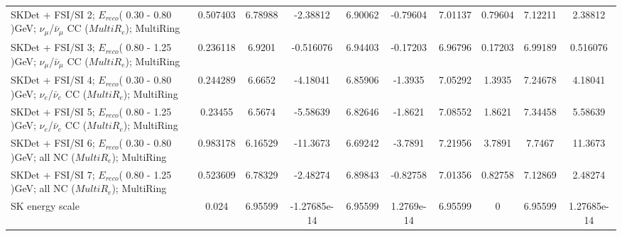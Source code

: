\begin{tabular}{| l | S | S  S | S  S | S  S | S  S | }
SKDet + FSI/SI  2; $E_{reco}$( 0.30 - 0.80 )GeV; $\nu_{\mu}$/$\bar{\nu}_{\mu}$ CC ($MultiR_{e}$); MultiRing &        0.507403 &         6.78988 &        -2.38812 &         6.90062 &        -0.79604 &         7.01137 &         0.79604 &         7.12211 &         2.38812 \\ 
SKDet + FSI/SI  3; $E_{reco}$( 0.80 - 1.25 )GeV; $\nu_{\mu}$/$\bar{\nu}_{\mu}$ CC ($MultiR_{e}$); MultiRing &        0.236118 &          6.9201 &       -0.516076 &         6.94403 &        -0.17203 &         6.96796 &         0.17203 &         6.99189 &        0.516076 \\ 
SKDet + FSI/SI  4; $E_{reco}$( 0.30 - 0.80 )GeV; $\nu_{e}$/$\bar{\nu}_{e}$ CC ($MultiR_{e}$); MultiRing &        0.244289 &          6.6652 &        -4.18041 &         6.85906 &         -1.3935 &         7.05292 &          1.3935 &         7.24678 &         4.18041 \\ 
SKDet + FSI/SI  5; $E_{reco}$( 0.80 - 1.25 )GeV; $\nu_{e}$/$\bar{\nu}_{e}$ CC ($MultiR_{e}$); MultiRing &         0.23455 &          6.5674 &        -5.58639 &         6.82646 &         -1.8621 &         7.08552 &          1.8621 &         7.34458 &         5.58639 \\ 
SKDet + FSI/SI  6; $E_{reco}$( 0.30 - 0.80 )GeV; all NC ($MultiR_{e}$); MultiRing &        0.983178 &         6.16529 &        -11.3673 &         6.69242 &         -3.7891 &         7.21956 &          3.7891 &          7.7467 &         11.3673 \\ 
SKDet + FSI/SI  7; $E_{reco}$( 0.80 - 1.25 )GeV; all NC ($MultiR_{e}$); MultiRing &        0.523609 &         6.78329 &        -2.48274 &         6.89843 &        -0.82758 &         7.01356 &         0.82758 &         7.12869 &         2.48274 \\ 
                                                                 SK energy scale &           0.024 &         6.95599 &    -1.27685e-14 &         6.95599 &      1.2769e-14 &         6.95599 &               0 &         6.95599 &     1.27685e-14 \\ 
\bottomrule
\end{tabular}
